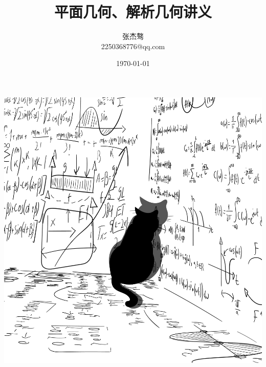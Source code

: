 \documentclass[a4paper]{ctexart}
\title{\bf{平面几何、解析几何讲义}}
\author{张杰骜\\2250368776@qq.com}
\date{\today}
\begin{document}
\maketitle%
\begin{center}%
    \includegraphics[scale=0.2]{0}
\end{center}%
\newpage
\tableofcontents%
\newpage
\raggedbottom%

%

\newpage

\newpage

\newpage

\newpage

\newpage

\newpage

\newpage

\end{document}
